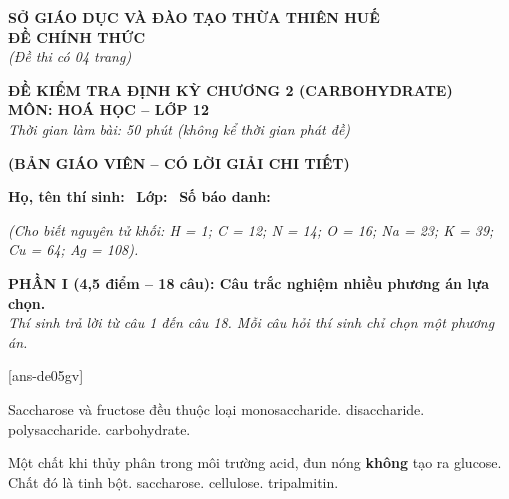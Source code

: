 \documentclass[12pt,a4paper]{article}
\begin{document}
\thispagestyle{firstpage}

\noindent
\begin{minipage}[t]{0.44\textwidth}
	\centering\fontsize{10pt}{12pt}\selectfont
	\textbf{SỞ GIÁO DỤC VÀ ĐÀO TẠO THỪA THIÊN HUẾ}\\
	\textbf{ĐỀ CHÍNH THỨC}\\
	\textit{(Đề thi có 04 trang)}
\end{minipage}\hfill
\begin{minipage}[t]{0.54\textwidth}
	\centering\small
	\textbf{ĐỀ KIỂM TRA ĐỊNH KỲ CHƯƠNG 2 (CARBOHYDRATE)}\\
	\textbf{MÔN: HOÁ HỌC -- LỚP 12}\\
	\textit{Thời gian làm bài: 50 phút (không kể thời gian phát đề)}\\
\end{minipage}

\smallskip
\begin{center}
	{\color{hfRed}\textbf{\large (BẢN GIÁO VIÊN -- CÓ LỜI GIẢI CHI TIẾT)}}
\end{center}

\smallskip
\noindent\hrulefill
\smallskip

\noindent\textbf{Họ, tên thí sinh:} \dotfill\ \textbf{Lớp:} \dotfill\ \textbf{Số báo danh:} \dotfill

\smallskip
\noindent\textit{(Cho biết nguyên tử khối: H = 1; C = 12; N = 14; O = 16; Na = 23; K = 39; Cu = 64; Ag = 108).}

\vspace{0.2cm}
\noindent
\textbf{PHẦN I (4,5 điểm -- 18 câu): Câu trắc nghiệm nhiều phương án lựa chọn.}\\
\textit{Thí sinh trả lời từ câu 1 đến câu 18. Mỗi câu hỏi thí sinh chỉ chọn một phương án.}

[ans-de05gv]

\begin{ex}
Saccharose và fructose đều thuộc loại
\choice
{monosaccharide.}
{disaccharide.}
{polysaccharide.}
{\True carbohydrate.}
\end{ex}

\begin{ex}
Một chất khi thủy phân trong môi trường acid, đun nóng \textbf{không} tạo ra glucose. Chất đó là
\choice
{tinh bột.}
{saccharose.}
{cellulose.}
{\True tripalmitin.}
\end{ex}
\end{document}
